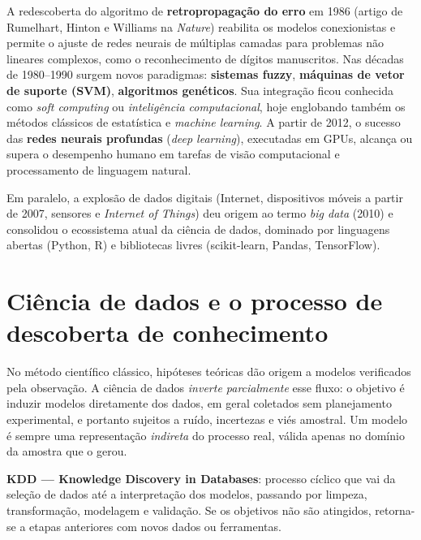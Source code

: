 A redescoberta do algoritmo de \textbf{retropropagação do erro} em 1986
(artigo de Rumelhart, Hinton e Williams na \emph{Nature}) reabilita os
modelos conexionistas e permite o ajuste de redes neurais de múltiplas
camadas para problemas não lineares complexos, como o reconhecimento de
dígitos manuscritos. Nas décadas de 1980--1990 surgem novos paradigmas:
\textbf{sistemas fuzzy}, \textbf{máquinas de vetor de suporte (SVM)},
\textbf{algoritmos genéticos}. Sua integração ficou conhecida como
\emph{soft computing} ou \emph{inteligência computacional}, hoje
englobando também os métodos clássicos de estatística e \emph{machine
learning}. A partir de 2012, o sucesso das \textbf{redes neurais
profundas} (\emph{deep learning}), executadas em GPUs, alcança ou supera o
desempenho humano em tarefas de visão computacional e processamento de
linguagem natural.

Em paralelo, a explosão de dados digitais (Internet, dispositivos móveis a
partir de 2007, sensores e \emph{Internet of Things}) deu origem ao termo
\emph{big data} (2010) e consolidou o ecossistema atual da ciência de
dados, dominado por linguagens abertas (Python, R) e bibliotecas livres
(scikit-learn, Pandas, TensorFlow).

\section{Ciência de dados e o processo de descoberta de conhecimento}

No método científico clássico, hipóteses teóricas dão origem a modelos
verificados pela observação. A ciência de dados \emph{inverte
parcialmente} esse fluxo: o objetivo é induzir modelos diretamente dos
dados, em geral coletados sem planejamento experimental, e portanto
sujeitos a ruído, incertezas e viés amostral. Um modelo é sempre uma
representação \emph{indireta} do processo real, válida apenas no domínio
da amostra que o gerou.

\begin{conceito}
\textbf{KDD — Knowledge Discovery in Databases}: processo cíclico que vai
da seleção de dados até a interpretação dos modelos, passando por
limpeza, transformação, modelagem e validação. Se os objetivos não são
atingidos, retorna-se a etapas anteriores com novos dados ou ferramentas.
\end{conceito}

